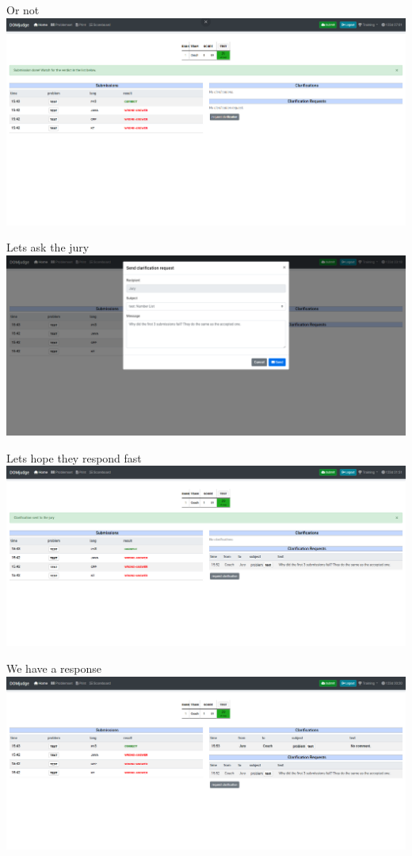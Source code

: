 \documentclass[11pt,pdf, aspectratio=169]{beamer}
\begin{document}
  \begin{frame}{Or not}
    \includegraphics[width=\linewidth]{images/session-1/domjudge-correct}
  \end{frame}
  \begin{frame}{Lets ask the jury}
    \includegraphics[width=\linewidth]{images/session-1/domjudge-clar-1}
  \end{frame}
  \begin{frame}{Lets hope they respond fast}
    \includegraphics[width=\linewidth]{images/session-1/domjudge-clar-2}
  \end{frame}
  \begin{frame}{We have a response}
    \includegraphics[width=\linewidth]{images/session-1/domjudge-clar-3}
  \end{frame}
\end{document}
